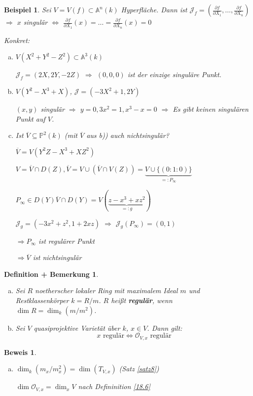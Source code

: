 \documentclass[a4paper, 12pt, numbers=noendperiod, chapterprefix=true, headsepline]{scrbook}
\theoremstyle{break}
\newtheorem{DefBem}[Def]{Definition + Bemerkung}
\theoremstyle{nonumberbreak}
\newtheorem{nnBsp}{Beispiel}
\newtheorem{Bew}{Beweis}
\theoremstyle{nonumberplain}
\newcommand{\emp}[1]{\textbf{\emph{#1}}}
\newcommand{\defterm}[1]{{\index{#1}}\emp{#1}}
\newcommand{\A}{\mathbb{A}}
\newcommand{\IP}{\mathbb{P}}%
\newcommand{\calJ}{\mathcal{J}}
\newcommand{\calO}{\mathcal{O}}
\begin{document}
\begin{nnBsp}
Sei $V=V(f)\subset\A^n(k)$ Hyperfl\"ache. Dann ist $\calJ_f=\left( \frac{\partial f}{\partial X_1},\ldots ,\frac{\partial f}{\partial X_n} \right)$ $\Longrightarrow$ $x$ singul\"ar $\Leftrightarrow$ $\frac{\partial f}{\partial X_1}(x)=\ldots =\frac{\partial f}{\partial X_n}(x)=0$

\emph{Konkret:}\begin{enumerate}[a)]
\item
	$V(X^2+Y^2-Z^2)\subset\A^3(k)$
	
	$\calJ_f=(2X,2Y,-2Z)$ $\Rightarrow $ $(0,0,0)$ ist der einzige singul\"are Punkt.
\item
	$V(Y^2-X^3+X)$, $\calJ=(-3X^2+1,2Y)$
	
	$(x,y)$ singul\"ar $\Rightarrow$ $y=0, 3x^2=1, x^3-x=0$ $\Rightarrow $ Es gibt keinen singul\"aren Punkt auf $V$.
\item
	Ist $\overline V\subseteq\IP^2(k)$ (mit $\overline V$ aus b)) auch nichtsingul\"ar?
	
	$\overline V=V(Y^2Z-X^3+XZ^2)$
	
	$V=\overline V\cap D(Z), \overline V=V\cup(\overline V\cap V(Z)) =\underbrace{V\cup\{(0:1:0)\}}_{=:P_\infty}$
	
	$P_\infty\in D(Y) \overline V\cap D(Y)=V(\underbrace{z-x^3+xz^2}_{=:g})$
	
	$\calJ_g=(-3x^2+z^2,1+2xz)$ $\Rightarrow $ $\calJ_g(P_\infty)=(0,1)$
	
	$\Rightarrow P_\infty$ ist regul\"arer Punkt
	
	$\Rightarrow \overline V$ ist nichtsingul\"ar
\end{enumerate}\end{nnBsp}

\begin{DefBem}\label{19.3}\begin{enumerate}[a)]
\item
	Sei $R$ noetherscher lokaler Ring mit maximalem Ideal $m$ und Restklassenk\"orper $k=R/m$. $R$ hei\ss t \defterm{regul\"ar}, wenn $\dim R=\dim_k(m/m^2)$.
\item\label{19.3b}
	Sei $V$ quasiprojektive Variet\"at \"uber $k$, $x\in V$. Dann gilt:
		\[x \text{ regul\"ar} \Leftrightarrow \calO_{V,x} \text{ regul\"ar}\]
\end{enumerate}\end{DefBem}

\begin{Bew}\begin{enumerate}[a)]
\item[b)]
	$\dim_k(m_x/m_x^2)=\dim(T_{V,x})$ (Satz \ref{satz8})
	
	$\dim \calO_{V,x}=\dim_x V$ nach Defininition \ref{18.6}
\end{enumerate}\end{Bew}
\end{document}
